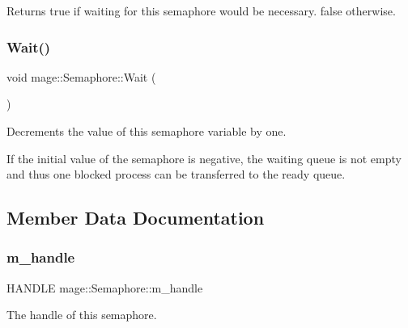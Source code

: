 \begin{DoxyReturn}{Returns}
{\ttfamily true} if waiting for this semaphore would be necessary. {\ttfamily false} otherwise. 
\end{DoxyReturn}
\hypertarget{classmage_1_1_semaphore_ae63599939b6bcc3939cbeddd7ffa5f66}{}\label{classmage_1_1_semaphore_ae63599939b6bcc3939cbeddd7ffa5f66} 
\subsubsection{\texorpdfstring{Wait()}{Wait()}}
{\footnotesize\ttfamily void mage\+::\+Semaphore\+::\+Wait (\begin{DoxyParamCaption}{ }\end{DoxyParamCaption})}

Decrements the value of this semaphore variable by one.

If the initial value of the semaphore is negative, the waiting queue is not empty and thus one blocked process can be transferred to the ready queue. 

\subsection{Member Data Documentation}
\hypertarget{classmage_1_1_semaphore_ac1ded856984b4ac3739d9ff627838fda}{}\label{classmage_1_1_semaphore_ac1ded856984b4ac3739d9ff627838fda} 
\subsubsection{\texorpdfstring{m\+\_\+handle}{m\_handle}}
{\footnotesize\ttfamily H\+A\+N\+D\+LE mage\+::\+Semaphore\+::m\+\_\+handle\hspace{0.3cm}{\ttfamily [private]}}

The handle of this semaphore. 